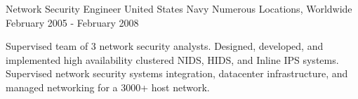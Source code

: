 \begin{cventries}
  \cventry
    {Network Security Engineer} %
    {United States Navy} %
    {Numerous Locations, Worldwide} %
    {February 2005 - February 2008} %
    {
      \begin{cvitems} %
        {Supervised team of 3 network security analysts. Designed, developed, and implemented high
        availability clustered NIDS, HIDS, and Inline IPS systems. Supervised network security systems
        integration, datacenter infrastructure, and managed networking for a 3000+ host network.}
      \end{cvitems}
    }    
\end{cventries}
